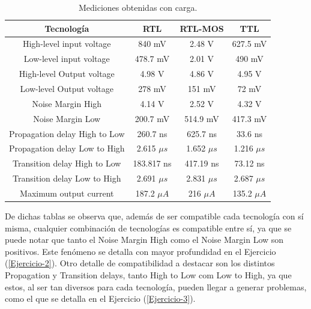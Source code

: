 \begin{table}[H]
\centering
\begin{tabular}{cccc}
\hline
\multicolumn{1}{c}{\textbf{Tecnología}} & \textbf{RTL}  & \textbf{RTL-MOS} & \multicolumn{1}{c}{\textbf{TTL}} \\ \hline
High-level input voltage                  & 840 mV        & 2.48 V           & 627.5 mV                          \\
Low-level input voltage                   & 478.7 mV      & 2.01 V         &    490 mV                         \\
High-level Output voltage                 & 4.98 V        & 4.86 V          & 4.95 V                            \\
Low-level Output voltage                  & 278 mV        & 151 mV           & 72 mV                             \\
Noise Margin High                         & 4.14 V        & 2.52 V           & 4.32 V                            \\
Noise Margin Low                          & 200.7 mV      & 514.9 mV         & 417.3 mV                          \\
Propagation delay High to Low             & 260.7 ns      & 625.7 ns         & 33.6 ns \\
Propagation delay Low to High             & 2.615 $\mu s$ & 1.652 $\mu s$    & 1.216 $\mu s$                     \\
Transition delay High to Low              & 183.817 ns    & 417.19 ns        & 73.12 ns                          \\
Transition delay Low to High              & 2.691 $\mu s$ & 2.831 $\mu s$    & 2.687 $\mu s$                     \\
Maximum output current                    &  187.2 $\mu A$             &     216 $\mu A$             &   135.2 $\mu A$       \\
\hline                        
\end{tabular}
\caption{Mediciones obtenidas con carga.}
\end{table}
 
De dichas tablas se observa que, además de ser compatible cada tecnología con sí misma, cualquier combinación de tecnologías es compatible entre sí, ya que se puede notar que tanto el Noise Margin High como el Noise Margin Low son positivos. Este fenómeno se detalla con mayor profundidad en el Ejercicio (\ref{Ejercicio-2}). Otro detalle de compatibilidad a destacar son los distintos Propagation y Transition delays, tanto High to Low com Low to High, ya que estos, al ser tan diversos para cada tecnología, pueden llegar a generar problemas, como el que se detalla en el Ejercicio (\ref{Ejercicio-3}).